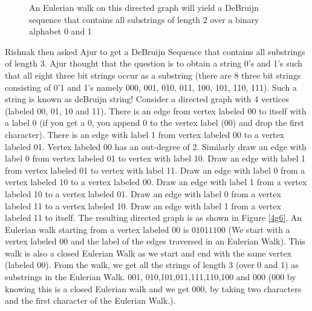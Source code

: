 \begin{figure}
\begin{center}
\caption{ An Eulerian walk on this directed graph will yield a DeBruijn sequence that contains  all substrings of length 2 over a binary alphabet 0 and 1}\label{4g55}
\end{center}
\end{figure}
Rishnak then asked Ajur to get a DeBruijn Sequence that contains all substrings of length 3.
Ajur thought that the question is to obtain a string 0's and 1's such that all eight three bit strings occur as a substring (there are 8 three bit strings consisting of 0'1 and 1's namely 000, 001, 010, 011, 100, 101, 110, 111). Such a string is known as deBruijn string!  Consider a directed graph with 4 vertices (labeled 00, 01, 10 and 11).
There is an edge from vertex labeled 00 to itself with a label 0 (if you get a 0, you append 0 to the vertex label (00) and drop the first character). There is an edge with label 1 from
vertex labeled 00 to a vertex labeled 01. Vertex labeled 00 has an out-degree of 2. Similarly draw an edge with label 0 from vertex labeled 01 to vertex with label 10. Draw an edge with label 1 from vertex labeled 01 to vertex with label 11. 
Draw an edge with label 0 from a  vertex labeled 10 to a vertex labeled 00. Draw an edge with label 1 from a vertex labeled 10 to a vertex labeled 01.
Draw an edge with label 0 from a vertex labeled 11 to a vertex labeled 10. Draw an edge with label 1 from a vertex labeled 11 to itself.
The resulting directed graph is as shown in Figure \ref{4g6}. An Eulerian walk starting from a vertex labeled 00 is $0 1 0 1 1 1 0 0$  (We start with a vertex labeled 00 and the label of the edges traversed in an Eulerian Walk). This walk is also a closed Eulerian Walk as we start and end with the same vertex (labeled $00$).
From the walk, we get all the strings of length 3 (over 0 and 1) as substrings in the Eulerian Walk.
001, 010,101,011,111,110,100 and 000 (000 by knowing this is a closed Eulerian walk and we get 000, by taking two characters and the first character of the Eulerian Walk.).

